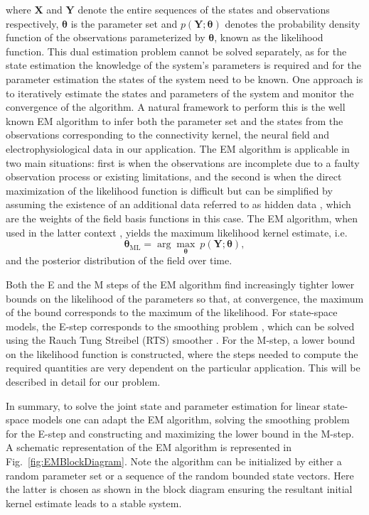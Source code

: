 \documentclass[review,authoryear,3p]{elsarticle}
\begin{document}
where $\mathbf X$ and $\mathbf Y$ denote the entire sequences of the states and observations respectively, $\boldsymbol\theta$ is the parameter set and $p(\mathbf Y;\boldsymbol\theta)$ denotes the probability density function of the observations parameterized  by $\boldsymbol\theta$, known as the likelihood function. This dual estimation problem cannot be solved separately, as for the state estimation the knowledge of the system's parameters is required and for the parameter estimation the states of the system need to be known. One approach is to iteratively estimate the states and parameters of the system and monitor the convergence of the algorithm. A natural framework to perform this is the well known EM algorithm \citep{Dempster1977,Shumway2000} to infer both the parameter set and the states from the observations corresponding to the connectivity kernel, the neural field and electrophysiological data in our application. The EM algorithm is applicable  in two main situations:  first is when the observations are incomplete due to a faulty observation process or existing limitations, and the second is when the direct maximization of the likelihood function is difficult but can be simplified by assuming the existence of an additional data referred to as hidden data \citep{Bilmes1998}, which are the weights of the field basis functions in this case. The EM algorithm, when used in the latter context \citep{Dewar2009}, yields the maximum likelihood kernel estimate, i.e.
\begin{equation}
	\boldsymbol\theta_{\text{ML}}=\arg\max_{\boldsymbol\theta}~p(\mathbf Y;\boldsymbol\theta),
 \end{equation}   
and the posterior distribution of the field over time.

Both the E and the M steps of the EM algorithm find increasingly tighter lower bounds on the likelihood of the parameters so that, at convergence, the maximum of the bound corresponds to the maximum of the likelihood. For state-space models, the E-step corresponds to the smoothing problem \citep{Haykin2001}, which can be solved using the Rauch Tung Streibel (RTS) smoother \citep{RAUCH1965}. For the M-step, a lower bound on the likelihood function is constructed, where the steps needed
to compute the required quantities are very dependent on the particular application. This will be described in detail for our problem. 

In summary, to solve the joint state and parameter estimation for linear state-space models one can adapt the EM algorithm, solving the smoothing problem for the E-step and constructing and maximizing the lower bound in the M-step. A schematic representation of the EM algorithm is represented in Fig.~\ref{fig:EMBlockDiagram}. Note the algorithm can be initialized by either a random parameter set or a sequence of the random bounded state vectors. Here the latter is chosen as shown in the block diagram ensuring the resultant initial kernel estimate leads to a stable system.  
\end{document}
